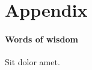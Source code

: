 \documentclass[paper.tex]{subfiles}
\begin{document}
\setcounter{section}{1}
\renewcommand{\thesection}{\Alpha{section}}
\setcounter{figure}{0}


\section*{Appendix}\label{s:conclusion}

\paragraph{Words of wisdom} Sit dolor amet.
\end{document}
